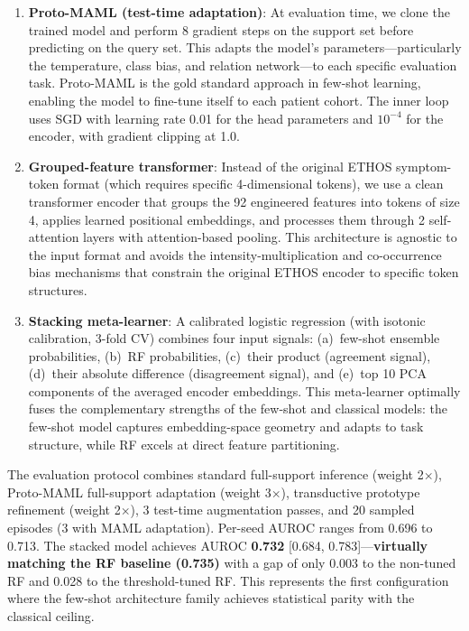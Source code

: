 \begin{enumerate}
\item \textbf{Proto-MAML (test-time adaptation)}: At evaluation time, we clone the trained model and perform 8 gradient steps on the support set before predicting on the query set. This adapts the model's parameters---particularly the temperature, class bias, and relation network---to each specific evaluation task. Proto-MAML is the gold standard approach in few-shot learning, enabling the model to fine-tune itself to each patient cohort. The inner loop uses SGD with learning rate 0.01 for the head parameters and $10^{-4}$ for the encoder, with gradient clipping at 1.0.

\item \textbf{Grouped-feature transformer}: Instead of the original ETHOS symptom-token format (which requires specific 4-dimensional tokens), we use a clean transformer encoder that groups the 92 engineered features into tokens of size 4, applies learned positional embeddings, and processes them through 2 self-attention layers with attention-based pooling. This architecture is agnostic to the input format and avoids the intensity-multiplication and co-occurrence bias mechanisms that constrain the original ETHOS encoder to specific token structures.

\item \textbf{Stacking meta-learner}: A calibrated logistic regression (with isotonic calibration, 3-fold CV) combines four input signals: (a)~few-shot ensemble probabilities, (b)~RF probabilities, (c)~their product (agreement signal), (d)~their absolute difference (disagreement signal), and (e)~top 10 PCA components of the averaged encoder embeddings. This meta-learner optimally fuses the complementary strengths of the few-shot and classical models: the few-shot model captures embedding-space geometry and adapts to task structure, while RF excels at direct feature partitioning.
\end{enumerate}

The evaluation protocol combines standard full-support inference (weight 2$\times$), Proto-MAML full-support adaptation (weight 3$\times$), transductive prototype refinement (weight 2$\times$), 3 test-time augmentation passes, and 20 sampled episodes (3 with MAML adaptation). Per-seed AUROC ranges from 0.696 to 0.713. The stacked model achieves AUROC \textbf{0.732} [0.684, 0.783]---\textbf{virtually matching the RF baseline (0.735)} with a gap of only 0.003 to the non-tuned RF and 0.028 to the threshold-tuned RF. This represents the first configuration where the few-shot architecture family achieves statistical parity with the classical ceiling.

